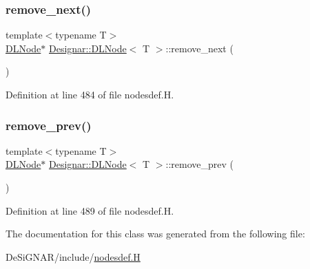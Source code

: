 \subsubsection{\texorpdfstring{remove\+\_\+next()}{remove\_next()}}
{\footnotesize\ttfamily template$<$typename T$>$ \\
\hyperlink{class_designar_1_1_d_l_node}{D\+L\+Node}$\ast$ \hyperlink{class_designar_1_1_d_l_node}{Designar\+::\+D\+L\+Node}$<$ T $>$\+::remove\+\_\+next (\begin{DoxyParamCaption}{ }\end{DoxyParamCaption})\hspace{0.3cm}{\ttfamily [inline]}}



Definition at line 484 of file nodesdef.\+H.

\mbox{\label{class_designar_1_1_d_l_node_a0bd2bf491ab61ab3fd1eb6b8b06dcae5}} 
\subsubsection{\texorpdfstring{remove\+\_\+prev()}{remove\_prev()}}
{\footnotesize\ttfamily template$<$typename T$>$ \\
\hyperlink{class_designar_1_1_d_l_node}{D\+L\+Node}$\ast$ \hyperlink{class_designar_1_1_d_l_node}{Designar\+::\+D\+L\+Node}$<$ T $>$\+::remove\+\_\+prev (\begin{DoxyParamCaption}{ }\end{DoxyParamCaption})\hspace{0.3cm}{\ttfamily [inline]}}



Definition at line 489 of file nodesdef.\+H.



The documentation for this class was generated from the following file\+:\begin{DoxyCompactItemize}
\item 
De\+Si\+G\+N\+A\+R/include/\hyperlink{nodesdef_8_h}{nodesdef.\+H}\end{DoxyCompactItemize}
